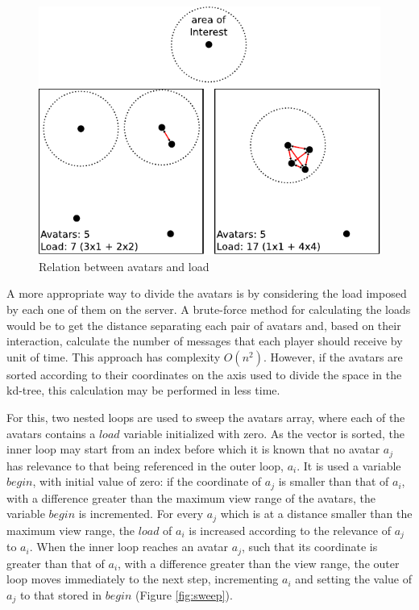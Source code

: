 \documentclass[acmtocl]{acmtrans2m}
\begin{document}
\begin{figure}
  \centering
  \includegraphics[width=0.8\linewidth]{images/carga}
  \caption{Relation between avatars and load}
  \label{fig:load}
\end{figure}

A more appropriate way to divide the avatars is by considering the load imposed by each one of them on the server. A brute-force method for calculating the loads would be to get the distance separating each pair of avatars and, based on their interaction, calculate the number of messages that each player should receive by unit of time. This approach has complexity $O(n^2)$. However, if the avatars are sorted according to their coordinates on the axis used to divide the space in the kd-tree, this calculation may be performed in less time.

For this, two nested loops are used to sweep the avatars array, where each of the avatars contains a $load$ variable initialized with zero. As the vector is sorted, the inner loop may start from an index before which it is known that no avatar $a_j$ has relevance to that being referenced in the outer loop, $a_i$. It is used a variable $begin$, with initial value of zero: if the coordinate of $a_j$ is smaller than that of $a_i$, with a difference greater than the maximum view range of the avatars, the variable $begin$ is incremented. For every $a_j$ which is at a distance smaller than the maximum view range, the $load$ of $a_i$ is increased according to the relevance of $a_j$ to $a_i$. When the inner loop reaches an avatar $a_j$, such that its coordinate is greater than that of $a_i$, with a difference greater than the view range, the outer loop moves immediately to the next step, incrementing $a_i$ and setting the value of $a_j$ to that stored in $begin$ (Figure \ref{fig:sweep}).
\end{document}
